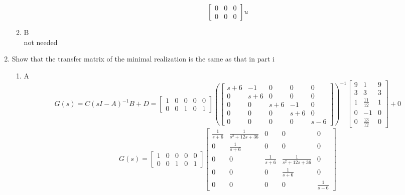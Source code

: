 \begin{enumerate}
\begin{enumerate}
\begin{equation}
        \left[\begin{matrix}0 & 0 & 0\\0 & 0 & 0\end{matrix}\right] u
      \end{equation}
    \item B\\
      not needed
    \end{enumerate}
  \item Show that the transfer matrix of the minimal realization is the same as that in part i \\
    \begin{enumerate}
    \item A\\
      \begin{equation}
        G(s) = C(sI-A)^{-1}B + D =
        \left[\begin{matrix}1 & 0 & 0 & 0 & 0\\0 & 0 & 1 & 0 & 1\end{matrix}\right]
        (\left[\begin{matrix}s + 6 & -1 & 0 & 0 & 0\\0 & s + 6 & 0 & 0 & 0\\0 & 0 & s + 6 & -1 & 0\\0 & 0 & 0 & s + 6 & 0\\0 & 0 & 0 & 0 & s - 6\end{matrix}\right])^{-1}
        \left[\begin{matrix}9 & 1 & 9\\3 & 3 & 3\\1 & \frac{11}{12} & 1\\0 & -1 & 0\\0 & \frac{13}{12} & 0\end{matrix}\right] + 0
      \end{equation}
      \begin{equation}
        G(s) = 
        \left[\begin{matrix}1 & 0 & 0 & 0 & 0\\0 & 0 & 1 & 0 & 1\end{matrix}\right]
        \left[\begin{matrix}\frac{1}{s + 6} & \frac{1}{s^{2} + 12 s + 36} & 0 & 0 & 0\\0 & \frac{1}{s + 6} & 0 & 0 & 0\\0 & 0 & \frac{1}{s + 6} & \frac{1}{s^{2} + 12 s + 36} & 0\\0 & 0 & 0 & \frac{1}{s + 6} & 0\\0 & 0 & 0 & 0 & \frac{1}{s - 6}\end{matrix}\right]

\end{equation}
\end{enumerate}
\end{enumerate}
